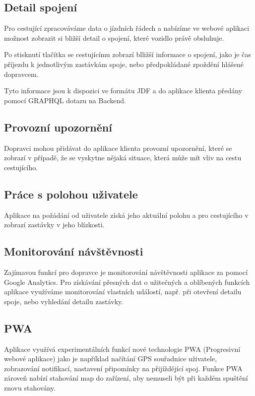 \subsection{Detail spojení}
Pro cestující zpracováváme data o jízdních řádech a nabízíme ve webové aplikaci možnost zobrazit si bližší detail o spojení, které vozidlo právě obsluhuje.

Po stisknutí tlačítka se cestujícímu zobrazí blližší informace o spojení, jako je čas příjezdu k jednotlivým zastávkám spoje, nebo předpokládané zpoždění hlášené dopravcem.

Tyto informace jsou k dispozici ve formátu JDF a do aplikace klienta předány pomocí GRAPHQL dotazu na Backend.

\subsection{Provozní upozornění}
Dopravci mohou přidávat do aplikace klienta provozní upozornění, které se zobrazí v případě, že se vyskytne nějaká situace, která může mít vliv na cestu cestujícího.
\subsection{Práce s polohou uživatele}
Aplikace na požádání od uživatele získá jeho aktuální polohu a pro cestujícího v zobrazí zastávky v jeho blízkosti.
\subsection{Monitorování návštěvnosti}
Zajímavou funkcí pro dopravce je monitorování návštěvnosti aplikace za pomocí Google Analytics. Pro získávání přesných dat o užitečných a oblíbených funkcích aplikace využíváme monitorování vlastních událostí, např. při otevření detailu spoje, nebo vyhledání detailu zastávky.
\subsection{PWA}
Aplikace využívá experimentálních funkcí nové technologie PWA (Progresivní webové aplikace) jako je například načítání GPS souřadnice uživatele, zobrazování notifikací, nastavení připomínky na přijíždějící spoj.
Funkce PWA zároveň nabízí stahování map do zařízení, aby nemuseli být při každém spuštění znovu stahovány.